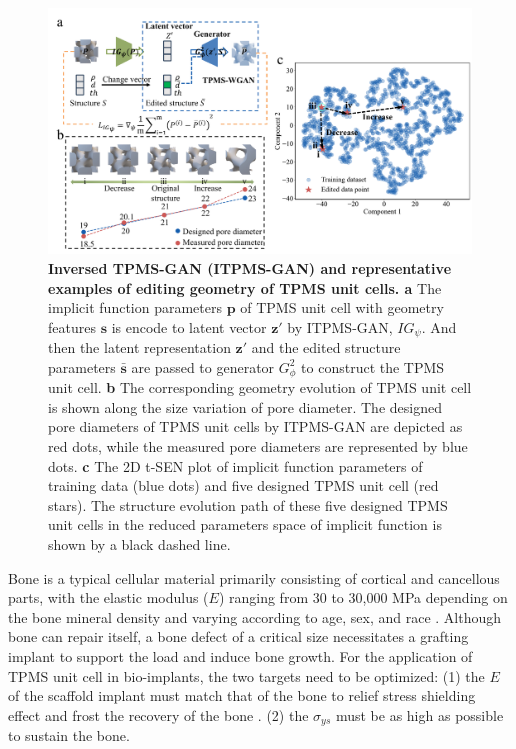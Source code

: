 \documentclass[preprint,review,12pt,authoryear]{elsarticle}
\begin{document}
\begin{figure}
    \centering
    \includegraphics[width=1\linewidth]{figures/5.pdf}
    \caption{\textbf{Inversed TPMS-GAN (ITPMS-GAN) and representative examples of editing geometry of TPMS unit cells. a} The implicit function parameters $\boldsymbol{p}$ of TPMS unit cell with geometry features $\boldsymbol{s}$ is encode to latent vector $\boldsymbol{z}'$ by ITPMS-GAN, $IG_\psi$. And then the latent representation $\boldsymbol{z}'$ and the edited structure parameters $\bar{\boldsymbol{s}}$ are passed to generator $G_\phi^2$ to construct the TPMS unit cell. \textbf{b} The corresponding geometry evolution of TPMS unit cell is shown along the size variation of pore diameter. The designed pore diameters of TPMS unit cells by ITPMS-GAN are depicted as red dots, while the measured pore diameters are represented by blue dots. \textbf{c} The 2D t-SEN plot of implicit function parameters of training data (blue dots) and five designed TPMS unit cell (red stars). The structure evolution path of these five designed TPMS unit cells in the reduced parameters space of implicit function is shown by a black dashed line. }
    \label{fig:5}
\end{figure}

Bone is a typical cellular material primarily consisting of cortical and cancellous parts, with the elastic modulus ($E$) ranging from 30 to 30,000 MPa depending on the bone mineral density and varying according to age, sex, and race \citep{Wang2016}. Although bone can repair itself, a bone defect of a critical size necessitates a grafting implant to support the load and induce bone growth. For the application of TPMS unit cell in bio-implants, the two targets need to be optimized: (1) the $E$ of the scaffold implant must match that of the bone to relief stress shielding effect and frost the recovery of the bone \citep{Yang2020}. (2) the $\sigma_{ys}$ must be as high as possible to sustain the bone. 
\end{document}

